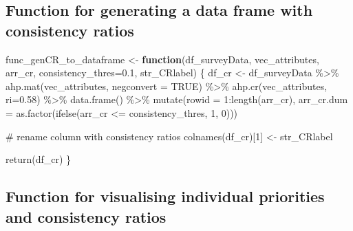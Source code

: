 \documentclass[
]{article}
\newenvironment{Shaded}{\begin{snugshade}}{\end{snugshade}}
\newcommand{\AttributeTok}[1]{\textcolor[rgb]{0.00,0.34,0.68}{#1}}
\newcommand{\CommentTok}[1]{\textcolor[rgb]{0.54,0.53,0.53}{#1}}
\newcommand{\ConstantTok}[1]{\textcolor[rgb]{0.67,0.33,0.00}{#1}}
\newcommand{\ControlFlowTok}[1]{\textcolor[rgb]{0.12,0.11,0.11}{\textbf{#1}}}
\newcommand{\DecValTok}[1]{\textcolor[rgb]{0.69,0.50,0.00}{#1}}
\newcommand{\FloatTok}[1]{\textcolor[rgb]{0.69,0.50,0.00}{#1}}
\newcommand{\FunctionTok}[1]{\textcolor[rgb]{0.39,0.29,0.61}{#1}}
\newcommand{\NormalTok}[1]{\textcolor[rgb]{0.12,0.11,0.11}{#1}}
\newcommand{\OtherTok}[1]{\textcolor[rgb]{0.00,0.43,0.16}{#1}}
\newcommand{\SpecialCharTok}[1]{\textcolor[rgb]{0.24,0.68,0.91}{#1}}
\begin{document}
\hypertarget{function-for-generating-a-data-frame-with-consistency-ratios}{%
\subsection{Function for generating a data frame with consistency
ratios}\label{function-for-generating-a-data-frame-with-consistency-ratios}}

\begin{Shaded}
\begin{Highlighting}[]
\NormalTok{func\_genCR\_to\_dataframe }\OtherTok{\textless{}{-}} \ControlFlowTok{function}\NormalTok{(df\_surveyData, vec\_attributes, arr\_cr, }\AttributeTok{consistency\_thres=}\FloatTok{0.1}\NormalTok{, str\_CRlabel) \{}
\NormalTok{  df\_cr }\OtherTok{\textless{}{-}}\NormalTok{ df\_surveyData }\SpecialCharTok{\%\textgreater{}\%}
    \FunctionTok{ahp.mat}\NormalTok{(vec\_attributes, }\AttributeTok{negconvert =} \ConstantTok{TRUE}\NormalTok{) }\SpecialCharTok{\%\textgreater{}\%} 
    \FunctionTok{ahp.cr}\NormalTok{(vec\_attributes, }\AttributeTok{ri=}\FloatTok{0.58}\NormalTok{) }\SpecialCharTok{\%\textgreater{}\%} 
    \FunctionTok{data.frame}\NormalTok{() }\SpecialCharTok{\%\textgreater{}\%}
    \FunctionTok{mutate}\NormalTok{(}\AttributeTok{rowid =} \DecValTok{1}\SpecialCharTok{:}\FunctionTok{length}\NormalTok{(arr\_cr), }\AttributeTok{arr\_cr.dum =} \FunctionTok{as.factor}\NormalTok{(}\FunctionTok{ifelse}\NormalTok{(arr\_cr }\SpecialCharTok{\textless{}=}\NormalTok{ consistency\_thres, }\DecValTok{1}\NormalTok{, }\DecValTok{0}\NormalTok{)))}
  
  \CommentTok{\# rename column with consistency ratios}
  \FunctionTok{colnames}\NormalTok{(df\_cr)[}\DecValTok{1}\NormalTok{] }\OtherTok{\textless{}{-}}\NormalTok{ str\_CRlabel}

  \FunctionTok{return}\NormalTok{(df\_cr)}
\NormalTok{\}}
\end{Highlighting}
\end{Shaded}

\hypertarget{function-for-visualising-individual-priorities-and-consistency-ratios}{%
\subsection{Function for visualising individual priorities and
consistency
ratios}\label{function-for-visualising-individual-priorities-and-consistency-ratios}}
\end{document}

